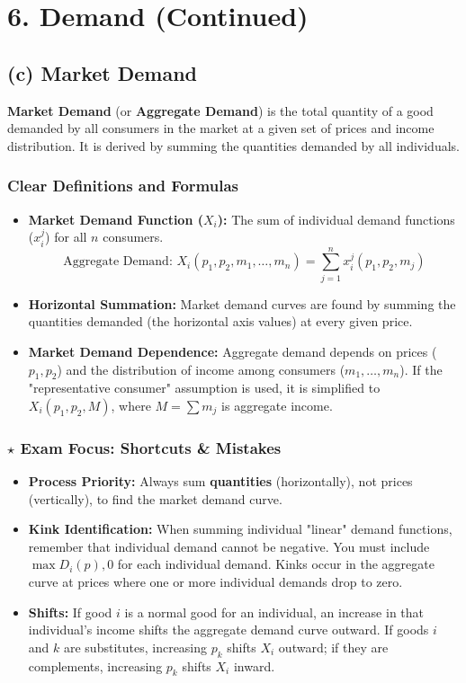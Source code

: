 \documentclass{article}
\begin{document}
\hrulefill

\section*{6. Demand (Continued)}
\subsection*{(c) Market Demand}

\textbf{Market Demand} (or \textbf{Aggregate Demand}) is the total quantity of a good demanded by all consumers in the market at a given set of prices and income distribution. It is derived by summing the quantities demanded by all individuals.

\subsubsection*{Clear Definitions and Formulas}
\begin{itemize}
    \item \textbf{Market Demand Function ($X_i$):} The sum of individual demand functions ($x_{i}^j$) for all $n$ consumers. 
    \[\text{Aggregate Demand: } X_i(p_1, p_2, m_1, \dots, m_n) = \sum_{j=1}^{n} x_{i}^j(p_1, p_2, m_j)\]
    \item \textbf{Horizontal Summation:} Market demand curves are found by summing the quantities demanded (the horizontal axis values) at every given price.
    \item \textbf{Market Demand Dependence:} Aggregate demand depends on prices ($p_1, p_2$) and the distribution of income among consumers ($m_1, \dots, m_n$). If the "representative consumer" assumption is used, it is simplified to $X_i(p_1, p_2, M)$, where $M = \sum m_j$ is aggregate income.
\end{itemize}

\subsubsection*{$\star$ Exam Focus: Shortcuts \& Mistakes}
\begin{itemize}
    \item \textbf{Process Priority:} Always sum \textbf{quantities} (horizontally), not prices (vertically), to find the market demand curve.
    \item \textbf{Kink Identification:} When summing individual "linear" demand functions, remember that individual demand cannot be negative. You must include $\max{D_i(p), 0}$ for each individual demand. Kinks occur in the aggregate curve at prices where one or more individual demands drop to zero.
    \item \textbf{Shifts:} If good $i$ is a normal good for an individual, an increase in that individual's income shifts the aggregate demand curve outward. If goods $i$ and $k$ are substitutes, increasing $p_k$ shifts $X_i$ outward; if they are complements, increasing $p_k$ shifts $X_i$ inward.
\end{itemize}
\end{document}
